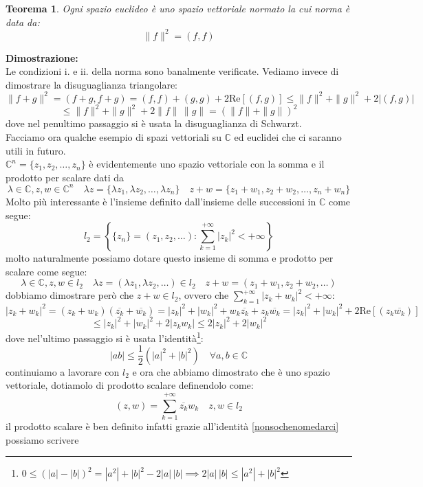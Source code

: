 \documentclass[12pt]{book}
\theoremstyle{plain}
\newcommand{\C}{\mathbb{C}}
\newtheorem{thm}{Teorema}[section]
\theoremstyle{definition}
\theoremstyle{remark}
\begin{document}
\begin{thm}
Ogni spazio euclideo è uno spazio vettoriale normato la cui norma è data da:
\[\|f\|^2 = (f,f)\]
\end{thm}
\hspace{-1.6em}\textbf{Dimostrazione:}\\
Le condizioni i. e ii. della norma sono banalmente verificate. Vediamo invece di dimostrare la disuguaglianza triangolare:
\[\|f+g\|^2 = (f+g,f+g) = (f,f)+(g,g)+2\text{Re}[(f,g)]\leq \|f\|^2 + \|g\|^2 + 2|(f,g)|\] 
\[\leq  \|f\|^2 + \|g\|^2  + 2\|f\|\,\|g\| = (\|f\|+\|g\|)^2\]
dove nel penultimo passaggio si è usata la disuguaglianza di Schwarzt.\\
\newline 
Facciamo ora qualche esempio di spazi vettoriali su $\C$ ed euclidei che ci saranno utili in futuro.\\
$\C^n = \{z_1,z_2,\dots,z_n\}$ è evidentemente uno spazio vettoriale con la somma e il prodotto per scalare dati da
\[\lambda \in\C,z,w\in\C^n \quad \lambda z =   \{ \lambda z_1, \lambda z_2,\dots, \lambda z_n\}\quad z+w =\{z_1+w_1,z_2+w_2,\dots,z_n+w_n\} \]
Molto più interessante è l'insieme definito dall'insieme delle successioni in $\C$ come segue:
\[l_2 = \left\{\{z_n\}=(z_1,z_2,\dots) : \sum_{k=1}^{+\infty}|z_k|^2<+\infty\right\}\]
molto naturalmente possiamo dotare questo insieme di somma e prodotto per scalare come segue:
\[\lambda \in\C,z,w\in l_2 \quad \lambda z =   (\lambda z_1, \lambda z_2,\dots)\in l_2 \quad z+w =(z_1+w_1,z_2+w_2,\dots) \]
dobbiamo dimostrare però che $z+w\in l_2$, ovvero che $\displaystyle\sum_{k=1}^{+\infty}|z_k+w_k|^2<+\infty$:
\[|z_k+w_k|^2 = (z_k+w_k)(\overline{z_k}+\overline{w_k}) = |z_k|^2+|w_k|^2 + w_k\overline{z_k} + z_k\overline{w_k} = |z_k|^2+|w_k|^2 + 2\text{Re}[(z_k\overline{w_k})]\]
\[\leq |z_k|^2+|w_k|^2 + 2|z_kw_k|\leq 2|z_k|^2+2|w_k|^2 \]
dove nel'ultimo passaggio si è usata l'identità\footnote{$0\leq (|a|-|b|)^2 = |a^2| + |b|^2 - 2|a|\,|b| \implies 2|a|\,|b| \leq |a^2| + |b|^2$}:
\begin{equation}
\label{nonsochenomedarci}
|ab|\leq \frac{1}{2}(|a|^2+|b|^2)\quad \forall a,b\in\C
\end{equation}
continuiamo a lavorare con $l_2$ e ora che abbiamo dimostrato che è uno spazio vettoriale, dotiamolo di prodotto scalare definendolo come:
\begin{equation}\label{innerproduct}(z,w) = \sum_{k=1}^{+\infty} \overline{z_k}{w_k} \quad z,w\in l_2\end{equation}
il prodotto scalare è ben definito infatti grazie all'identità \eqref{nonsochenomedarci} possiamo scrivere
\end{document}
